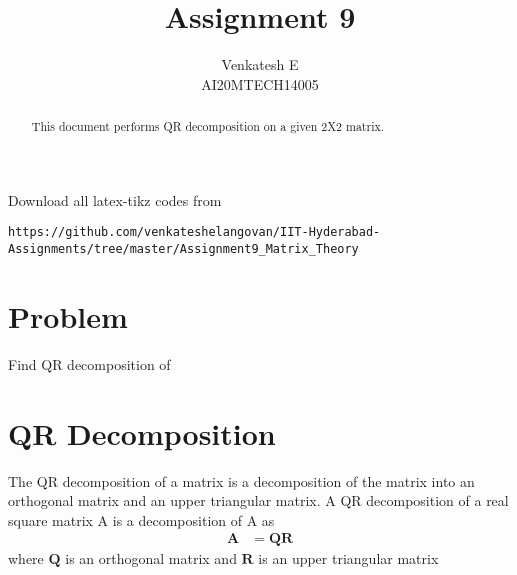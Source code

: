 \documentclass[journal,12pt,twocolumn]{IEEEtran}
\begin{document}
\makeatletter
{}
\makeatother
\let\StandardTheFigure\thefigure
\let\vec\mathbf
\renewcommand{\thefigure}{\theproblem}
\def\putbox#1#2#3{\makebox[0in][l]{\makebox[#1][l]{}\raisebox{\baselineskip}[0in][0in]{\raisebox{#2}[0in][0in]{#3}}}}
     \def\rightbox#1{\makebox[0in][r]{#1}}
     \def\centbox#1{\makebox[0in]{#1}}
     \def\topbox#1{\raisebox{-\baselineskip}[0in][0in]{#1}}
     \def\midbox#1{\raisebox{-0.5\baselineskip}[0in][0in]{#1}}
\vspace{3cm}
\title{Assignment 9}
\author{Venkatesh E\\AI20MTECH14005}
\maketitle
\newpage
\bigskip
\renewcommand{\thefigure}{\theenumi}
\renewcommand{\thetable}{\theenumi}
\begin{abstract}
This document performs QR decomposition on a given 2X2  matrix.
\end{abstract}
Download all latex-tikz codes from 
%
\begin{lstlisting}
https://github.com/venkateshelangovan/IIT-Hyderabad-Assignments/tree/master/Assignment9_Matrix_Theory
\end{lstlisting}
\section{Problem}
Find QR decomposition of 
\section{QR Decomposition}
The QR decomposition  of a matrix is a decomposition of the matrix into an orthogonal matrix and an upper triangular matrix. A QR decomposition of a real square matrix A is a decomposition of A as
\begin{align}
    \vec{A}&=\vec{Q}\vec{R}
\end{align}
where $\vec{Q}$ is an orthogonal matrix and $\vec{R}$ is an upper triangular matrix
\end{document}
